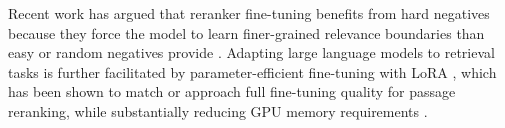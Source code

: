 Recent work has argued that reranker fine-tuning benefits from hard negatives because they force the model to learn finer-grained relevance boundaries than easy or random negatives provide \citep{MeghwaniEtAl2025HardNegatives, Aarsen2025TrainReranker}. Adapting large language models to retrieval tasks is further facilitated by parameter-efficient fine-tuning with LoRA \citep{hu2022lora}, which has been shown to match or approach full fine-tuning quality for passage reranking, while substantially reducing GPU memory requirements \citep{nijasure2025relevance}.